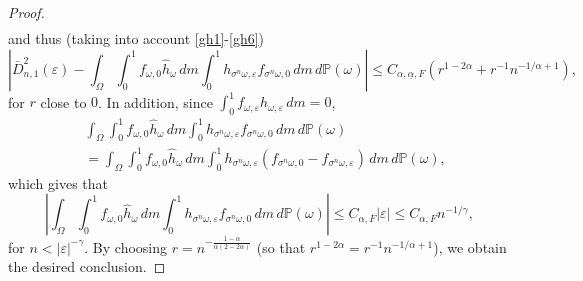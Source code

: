 \documentclass[10pt,a4paper]{amsart}
\begin{document}
\begin{proof}
\begin{equation}
\begin{split}
		\end{split}
	\end{equation} and thus (taking into account \eqref{gh1}-\eqref{gh6})
	\[
	\left |\bar D_{n, 1}^2(\varepsilon)-\int_\Omega \int_0^1 f_{\omega, 0}\hat h_\omega \, dm \int_0^1 h_{\sigma^n \omega, \varepsilon} f_{\sigma^n \omega, 0}\, dm \, d\mathbb P(\omega)\right | \le C_{\alpha, \underline{\alpha}, F} (r^{1-2\alpha}+r^{-1}n^{-1/\alpha+1}),
	\]
	for $r$ close to $0$. In addition, since $\int_0^1 f_{\omega, \varepsilon}h_{\omega, \varepsilon}\, dm=0$,
	\[
	\begin{split}
		& \int_\Omega \int_0^1 f_{\omega, 0}\hat h_\omega \, dm \int_0^1 h_{\sigma^n \omega, \varepsilon} f_{\sigma^n \omega, 0}\, dm \, d\mathbb P(\omega)\\
		&=\int_\Omega \int_0^1 f_{\omega, 0}\hat h_\omega \, dm \int_0^1 h_{\sigma^n \omega, \varepsilon} (f_{\sigma^n \omega, 0}-f_{\sigma^n \omega, \varepsilon})\, dm \, d\mathbb P(\omega),
	\end{split}
	\]
	which gives that
	\[
	\left |\int_\Omega \int_0^1 f_{\omega, 0}\hat h_\omega \, dm \int_0^1 h_{\sigma^n \omega, \varepsilon} f_{\sigma^n \omega, 0}\, dm \, d\mathbb P(\omega)\right | \le C_{\alpha, 
		F}|\varepsilon| \le C_{\alpha, F}n^{-1/\gamma},
	\]
	for $n<|\varepsilon|^{-\gamma}$. By choosing $r=n^{-\frac{1-\alpha}{\alpha (2-2\alpha)}}$ (so that $r^{1-2\alpha}=r^{-1}n^{-1/\alpha+1}$), we obtain the desired conclusion. %
\end{proof}
\end{document}
